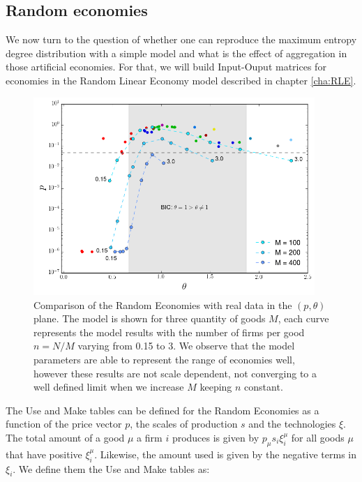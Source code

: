 \subsection{Random economies}

We now turn to the question of whether one can reproduce the maximum entropy degree distribution with a simple model and what is the effect of aggregation in those artificial economies. For that, we will build Input-Ouput matrices for economies in the Random Linear Economy model described in chapter \ref{cha:RLE}.

\begin{figure}[!ht]
  \centering
  \includegraphics[width=0.95\textwidth]{figs_io/theta_pval_model_orig.png}
  \caption{Comparison of the Random Economies with real data in the
    $(p, \theta)$ plane. The model is shown for three quantity of goods
    $M$, each curve represents the model results with the number of firms per good $n = N/M$ varying from 0.15 to 3. We observe that the model parameters are able to represent the range of economies well, however these results are not scale dependent, not converging to a well defined limit when we increase $M$ keeping $n$ constant.}
  \label{fig:theta_pval_model_orig}
\end{figure}


The Use and Make tables can be defined for the Random Economies as
a function of the price vector $p$, the scales of production $s$ and the technologies $\xi$. The total amount of a good $\mu$ a firm $i$ produces is given by $p_\mu s_i \xi_i^\mu$ for all goods $\mu$ that have positive $\xi_i^\mu$. Likewise, the amount used is given by the negative terms in $\xi_i$. We define them the Use and Make tables as:


